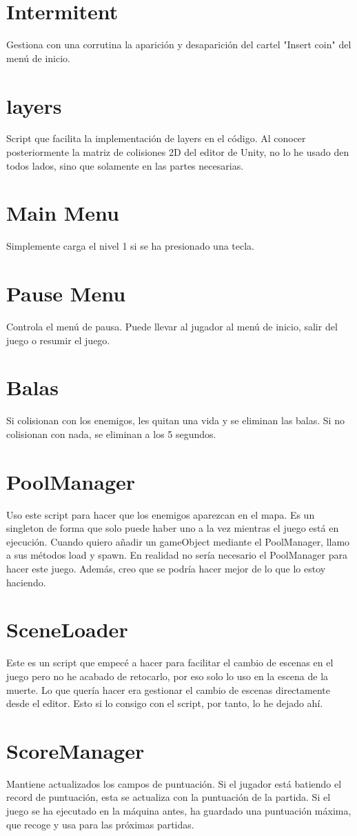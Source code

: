 \documentclass[titlepage, 4apaper]{article}
\begin{document}
\section{Intermitent}
Gestiona con una corrutina la aparición y desaparición del cartel "Insert coin" del menú de inicio.
\section{layers}
Script que facilita la implementación de layers en el código. Al conocer posteriormente la matriz de colisiones 2D del editor de Unity, no lo he usado den todos lados, sino que solamente en las partes necesarias.
\section{Main Menu}
Simplemente carga el nivel 1 si se ha presionado una tecla.
\section{Pause Menu}
Controla el menú de pausa. Puede llevar al jugador al menú de inicio, salir del juego o resumir el juego.
\section{Balas}
Si colisionan con los enemigos, les quitan una vida y se eliminan las balas. Si no colisionan con nada, se eliminan a los 5 segundos.
\section{PoolManager}
Uso este script para hacer que los enemigos aparezcan en el mapa. Es un singleton de forma que solo puede haber uno a la vez mientras el juego está en ejecución. Cuando quiero añadir un gameObject mediante el PoolManager, llamo a sus métodos load y spawn. En realidad no sería necesario el PoolManager para hacer este juego. Además, creo que se podría hacer mejor de lo que lo estoy haciendo.
\section{SceneLoader}
Este es un script que empecé a hacer para facilitar el cambio de escenas en el juego pero no he acabado de retocarlo, por eso solo lo uso en la escena de la muerte. Lo que quería hacer era gestionar el cambio de escenas directamente desde el editor. Esto si lo consigo con el script, por tanto, lo he dejado ahí.
\section{ScoreManager}
Mantiene actualizados los campos de puntuación. Si el jugador está batiendo el record de puntuación, esta se actualiza con la puntuación de la partida. Si el juego se ha ejecutado en la máquina antes, ha guardado una puntuación máxima, que recoge y usa para las próximas partidas.
\end{document}
